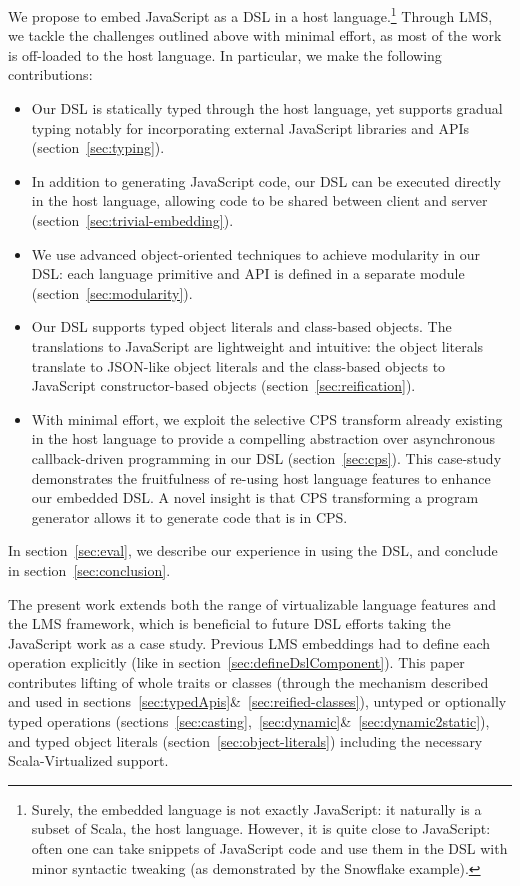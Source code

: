 \documentclass[runningheads,a4paper]{llncs}
\begin{document}
We propose to embed JavaScript as a DSL in a host language.\footnote{Surely, the embedded language is not exactly JavaScript: it naturally is a subset of Scala, the host language. However, it is quite close to JavaScript: often one can take snippets of JavaScript code and use them in the DSL with minor syntactic tweaking (as demonstrated by the Snowflake example).} Through LMS, we tackle the challenges outlined above with minimal effort, as most of the work is off-loaded to the host language. In particular, we make the following contributions:
\begin{itemize}
\item Our DSL is statically typed through the host language, yet supports gradual typing notably for incorporating external JavaScript libraries and APIs (section~\ref{sec:typing}).
\item In addition to generating JavaScript code, our DSL can be executed directly in the host language, allowing code to be shared between client and server (section~\ref{sec:trivial-embedding}).
\item We use advanced object-oriented techniques to achieve modularity in our DSL: each language primitive and API is defined in a separate module (section~\ref{sec:modularity}).
\item Our DSL supports typed object literals and class-based objects. The translations to JavaScript are lightweight and intuitive: the object literals translate to JSON-like object literals and the class-based objects to JavaScript constructor-based objects (section~\ref{sec:reification}).
\item With minimal effort, we exploit the selective CPS transform already existing in the host language to provide a compelling abstraction over asynchronous callback-driven programming in our DSL (section~\ref{sec:cps}). This case-study demonstrates the fruitfulness of re-using host language features to enhance our embedded DSL. A novel insight is that CPS transforming a program generator allows it to generate code that is in CPS.
\end{itemize}

In section~\ref{sec:eval}, we describe our experience in using the DSL, and conclude in section~\ref{sec:conclusion}.

The present work extends both the range of virtualizable language features and the LMS framework, which is beneficial to future DSL efforts taking the JavaScript work as a case study. Previous LMS embeddings had to define each operation explicitly (like in section~\ref{sec:defineDslComponent}). This paper contributes lifting of whole traits or classes (through the  mechanism described and used in sections~\ref{sec:typedApis}\&~\ref{sec:reified-classes}), untyped or optionally typed operations (sections~\ref{sec:casting},~\ref{sec:dynamic}\&~\ref{sec:dynamic2static}), and typed object literals (section~\ref{sec:object-literals}) including the necessary Scala-Virtualized support.
\end{document}
